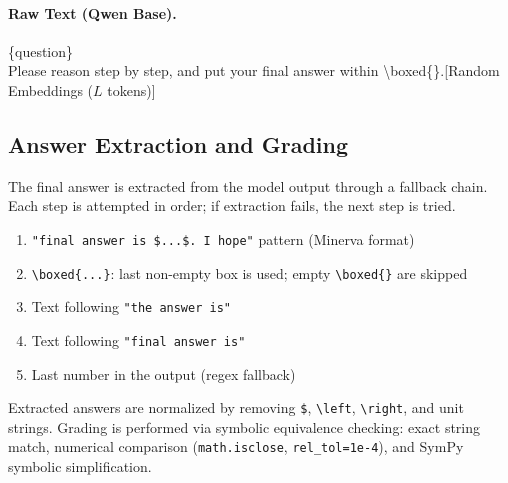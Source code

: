 \paragraph{Raw Text (Qwen Base).}
\begin{tcolorbox}[colback=gray!5, colframe=black!60, arc=3pt, boxrule=0.5pt, fontupper=\footnotesize\ttfamily, breakable]
\{question\}\\
Please reason step by step, and put your final answer within \textbackslash boxed\{\}.\textcolor{blue!70!black}{[Random Embeddings ($L$ tokens)]}
\end{tcolorbox}

\subsection{Answer Extraction and Grading}\label{app:extraction}

The final answer is extracted from the model output through a fallback chain. Each step is attempted in order; if extraction fails, the next step is tried.

\begin{tcolorbox}[colback=gray!5, colframe=black!60, arc=3pt, boxrule=0.5pt, title=\textbf{Answer Extraction Fallback Chain}, fonttitle=\small, coltitle=black, colbacktitle=gray!20]
\small
\begin{enumerate}[leftmargin=*, nosep]
  \item \texttt{"final answer is \$...\$. I hope"} pattern (Minerva format)
  \item \texttt{\textbackslash boxed\{...\}}: last non-empty box is used; empty \texttt{\textbackslash boxed\{\}} are skipped
  \item Text following \texttt{"the answer is"}
  \item Text following \texttt{"final answer is"}
  \item Last number in the output (regex fallback)
\end{enumerate}
\end{tcolorbox}

\vspace{0.5em}
Extracted answers are normalized by removing \texttt{\$}, \texttt{\textbackslash left}, \texttt{\textbackslash right}, and unit strings. Grading is performed via symbolic equivalence checking: exact string match, numerical comparison (\texttt{math.isclose}, \texttt{rel\_tol=1e-4}), and SymPy symbolic simplification.

